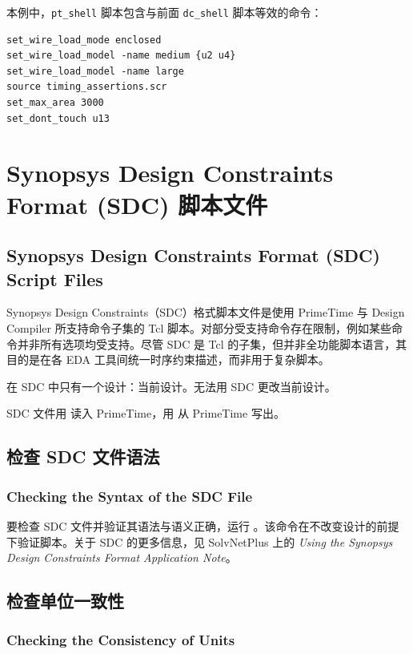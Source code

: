 本例中，\texttt{pt\_shell} 脚本包含与前面 \texttt{dc\_shell} 脚本等效的命令：
\begin{lstlisting}
set_wire_load_mode enclosed
set_wire_load_model -name medium {u2 u4}
set_wire_load_model -name large
source timing_assertions.scr
set_max_area 3000
set_dont_touch u13
\end{lstlisting}

\section{Synopsys Design Constraints Format (SDC) 脚本文件}
\subsection*{Synopsys Design Constraints Format (SDC) Script Files}

Synopsys Design Constraints（SDC）格式脚本文件是使用 PrimeTime 与 Design Compiler 所支持命令子集的 Tcl 脚本。对部分受支持命令存在限制，例如某些命令并非所有选项均受支持。尽管 SDC 是 Tcl 的子集，但并非全功能脚本语言，其目的是在各 EDA 工具间统一时序约束描述，而非用于复杂脚本。

在 SDC 中只有一个设计：当前设计。无法用 SDC 更改当前设计。

SDC 文件用  读入 PrimeTime，用  从 PrimeTime 写出。

\subsection{检查 SDC 文件语法}
\subsubsection*{Checking the Syntax of the SDC File}

要检查 SDC 文件并验证其语法与语义正确，运行 。该命令在不改变设计的前提下验证脚本。关于 SDC 的更多信息，见 SolvNetPlus 上的 \textit{Using the Synopsys Design Constraints Format Application Note}。

\subsection{检查单位一致性}
\subsubsection*{Checking the Consistency of Units}

